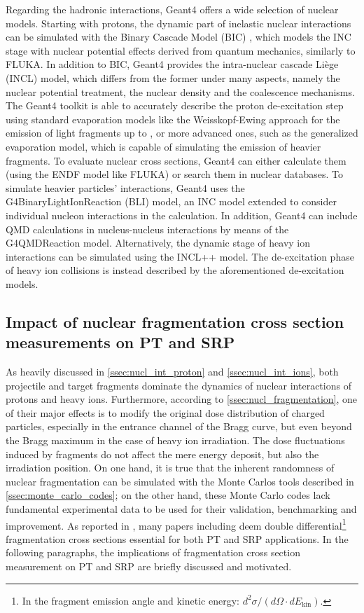 Regarding the hadronic interactions, Geant4 offers a wide selection of nuclear models. Starting with protons, the dynamic part of inelastic nuclear interactions can be simulated with the Binary Cascade Model (BIC) \cite{Folger2004-pz}, which models the INC stage with nuclear potential effects derived from quantum mechanics, similarly to FLUKA. In addition to BIC, Geant4 provides the intra-nuclear cascade Liège (INCL) \cite{PhysRevC.90.054602} model, which differs from the former under many aspects, namely the nuclear potential treatment, the nuclear density and the coalescence mechanisms. The Geant4 toolkit is able to accurately describe the proton de-excitation step using standard evaporation models like the Weisskopf-Ewing approach \cite{Dostrovsky1959-na} for the emission of light fragments up to , or more advanced ones, such as the generalized evaporation model, which is capable of simulating the emission of heavier fragments. To evaluate nuclear cross sections, Geant4 can either calculate them (using the ENDF model like FLUKA) or search them in nuclear databases. To simulate heavier particles' interactions, Geant4 uses the G4BinaryLightIonReaction (BLI) model, an INC model extended to consider individual nucleon interactions in the calculation. In addition, Geant4 can include QMD calculations in nucleus-nucleus interactions by means of the G4QMDReaction model. Alternatively, the dynamic stage of heavy ion interactions can be simulated using the INCL++ model. The de-excitation phase of heavy ion collisions is instead described by the aforementioned de-excitation models.
\subsection{Impact of nuclear fragmentation cross section measurements on PT and SRP}\label{ssec:cross_sect_nucl_frag}
As heavily discussed in \autoref{ssec:nucl_int_proton} and \autoref{ssec:nucl_int_ions}, both projectile and target fragments dominate the dynamics of nuclear interactions of protons and heavy ions. Furthermore, according to \autoref{ssec:nucl_fragmentation}, one of their major effects is to modify the original dose distribution of charged particles, especially in the entrance channel of the Bragg curve, but even beyond the Bragg maximum in the case of heavy ion irradiation. The dose fluctuations induced by fragments do not affect the mere energy deposit, but also the irradiation position. On one hand, it is true that the inherent randomness of nuclear fragmentation can be simulated with the Monte Carlos tools described in \autoref{ssec:monte_carlo_codes}; on the other hand, these Monte Carlo codes lack fundamental experimental data to be used for their validation, benchmarking and improvement. As reported in \cite{areFurtherCrossSectionMeasurementsNecessary}, many papers including \cite{Durante_2016,10.3389/fonc.2016.00065,RevModPhys.83.1245} deem double differential\footnote{In the fragment emission angle and kinetic energy: $d^2\sigma/(d\Omega\cdot dE_{\text{kin}})$.} fragmentation cross sections essential for both PT and SRP applications. In the following paragraphs, the implications of fragmentation cross section measurement on PT and SRP are briefly discussed and motivated.

